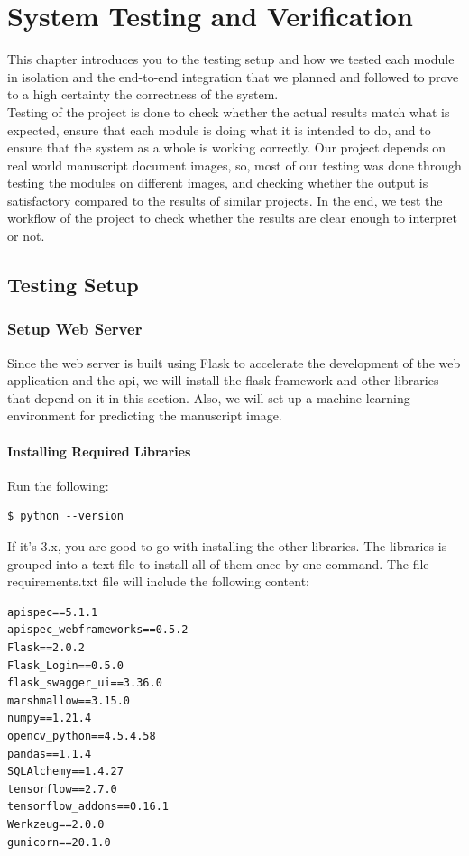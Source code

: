\chapter{System Testing and Verification}
\label{ch:system-testing}

This chapter introduces you to the testing setup and how we tested each module in isolation and the end-to-end integration that we planned and followed to prove to a high certainty the correctness of the system. \\

Testing of the project is done to check whether the actual results match what is expected, ensure that each module is doing what it is intended to do, and to ensure that the system as a whole is working correctly. Our project depends on real world manuscript document images, so, most of our testing was done through testing the modules on different images, and checking whether the output is satisfactory compared to the results of similar projects. In the end, we test the workflow of the project to check whether the results are clear enough to interpret or not.

\section{Testing Setup}
\subsection{Setup Web Server}
Since the web server is built using Flask to accelerate the development of the web application and the \acrfull{api}, we will install the flask framework and other libraries that depend on it in this section. Also, we will set up a machine learning environment for predicting the manuscript image.

\subsubsection{Installing Required Libraries}
Run the following:
\begin{verbatim}
$ python --version
\end{verbatim}
If it's 3.x, you are good to go with installing the other libraries. The libraries is grouped into a text file to install all of them once by one command. The file requirements.txt file will include the following content:

\begin{verbatim}
apispec==5.1.1
apispec_webframeworks==0.5.2
Flask==2.0.2
Flask_Login==0.5.0
flask_swagger_ui==3.36.0
marshmallow==3.15.0
numpy==1.21.4
opencv_python==4.5.4.58
pandas==1.1.4
SQLAlchemy==1.4.27
tensorflow==2.7.0
tensorflow_addons==0.16.1
Werkzeug==2.0.0
gunicorn==20.1.0
\end{verbatim}

